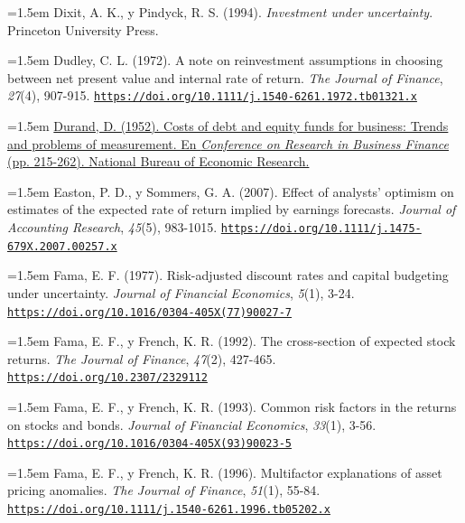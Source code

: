 \documentclass[10pt,a4paper]{article}
\begin{document}
\noindent\hangindent=1.5em Dixit, A. K., y Pindyck, R. S. (1994). \textit{Investment under uncertainty}. Princeton University Press.

\noindent\hangindent=1.5em Dudley, C. L. (1972). A note on reinvestment assumptions in choosing between net present value and internal rate of return. \textit{The Journal of Finance}, \textit{27}(4), 907-915. \href{https://doi.org/10.1111/j.1540-6261.1972.tb01321.x}{\nolinkurl{https://doi.org/10.1111/j.1540-6261.1972.tb01321.x}}

\noindent\hangindent=1.5em \href{https://www.nber.org/system/files/chapters/c4790/c4790.pdf}{Durand, D. (1952). Costs of debt and equity funds for business: Trends and problems of measurement. En \textit{Conference on Research in Business Finance} (pp. 215-262). National Bureau of Economic Research.}

\noindent\hangindent=1.5em Easton, P. D., y Sommers, G. A. (2007). Effect of analysts' optimism on estimates of the expected rate of return implied by earnings forecasts. \textit{Journal of Accounting Research}, \textit{45}(5), 983-1015. \href{https://doi.org/10.1111/j.1475-679X.2007.00257.x}{\nolinkurl{https://doi.org/10.1111/j.1475-679X.2007.00257.x}}

\noindent\hangindent=1.5em Fama, E. F. (1977). Risk-adjusted discount rates and capital budgeting under uncertainty. \textit{Journal of Financial Economics}, \textit{5}(1), 3-24. \href{https://doi.org/10.1016/0304-405X(77)90027-7}{\nolinkurl{https://doi.org/10.1016/0304-405X(77)90027-7}}

\noindent\hangindent=1.5em Fama, E. F., y French, K. R. (1992). The cross-section of expected stock returns. \textit{The Journal of Finance}, \textit{47}(2), 427-465. \href{https://doi.org/10.2307/2329112}{\nolinkurl{https://doi.org/10.2307/2329112}}

\noindent\hangindent=1.5em Fama, E. F., y French, K. R. (1993). Common risk factors in the returns on stocks and bonds. \textit{Journal of Financial Economics}, \textit{33}(1), 3-56. \href{https://doi.org/10.1016/0304-405X(93)90023-5}{\nolinkurl{https://doi.org/10.1016/0304-405X(93)90023-5}}

\noindent\hangindent=1.5em Fama, E. F., y French, K. R. (1996). Multifactor explanations of asset pricing anomalies. \textit{The Journal of Finance}, \textit{51}(1), 55-84. \href{https://doi.org/10.1111/j.1540-6261.1996.tb05202.x}{\nolinkurl{https://doi.org/10.1111/j.1540-6261.1996.tb05202.x}}
\end{document}

